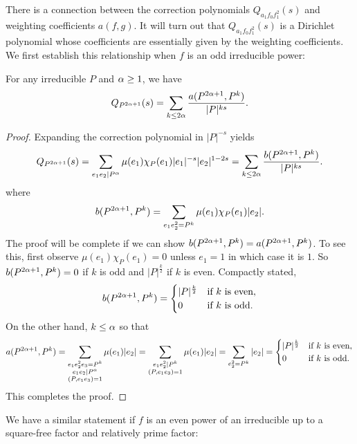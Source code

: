 \documentclass[12pt,reqno,oneside]{amsart}
\begin{document}
    There is a connection between the correction polynomials $Q_{a_{1}f_{0}f_{1}^{2}}(s)$ and weighting coefficients $a(f,g)$. It will turn out that $Q_{a_{1}f_{0}f_{1}^{2}}(s)$ is a Dirichlet polynomial whose coefficients are essentially given by the weighting coefficients. We first establish this relationship when $f$ is an odd irreducible power:

    \begin{lemma}\label{lem:prime_correction_odd}
        For any irreducible $P$ and $\alpha \ge 1$, we have
        \[
            Q_{P^{2\alpha+1}}(s) = \sum_{k \le 2\alpha}\frac{a(P^{2\alpha+1},P^{k})}{|P|^{ks}}.
        \]
    \end{lemma}
    \begin{proof}
        Expanding the correction polynomial in $|P|^{-s}$ yields
        \[
            Q_{P^{2\alpha+1}}(s) = \sum_{e_{1}e_{2} \mid P^{\alpha}}\mu(e_{1})\chi_{P}(e_{1})|e_{1}|^{-s}|e_{2}|^{1-2s} = \sum_{k \le 2\alpha}\frac{b(P^{2\alpha+1},P^{k})}{|P|^{ks}}.
        \]
        where
        \[
            b(P^{2\alpha+1},P^{k}) = \sum_{e_{1}e_{2}^{2} = P^{k}}\mu(e_{1})\chi_{P}(e_{1})|e_{2}|.
        \]
        The proof will be complete if we can show $b(P^{2\alpha+1},P^{k}) = a(P^{2\alpha+1},P^{k})$. To see this, first observe $\mu(e_{1})\chi_{P}(e_{1}) = 0$ unless $e_{1} = 1$ in which case it is $1$. So $b(P^{2\alpha+1},P^{k}) = 0$ if $k$ is odd and $|P|^{\frac{k}{2}}$ if $k$ is even. Compactly stated,
        \[
            b(P^{2\alpha+1},P^{k}) = \begin{cases} |P|^{\frac{k}{2}} & \text{if $k$ is even}, \\ 0 & \text{if $k$ is odd}. \end{cases}
        \]
        On the other hand, $k \le \alpha$ so that
        \[
            a(P^{2\alpha+1},P^{k}) = \sum_{\substack{e_{1}e_{2}^{2}e_{3} = P^{k} \\ e_{1}e_{2} \mid P^{\alpha} \\ (P,e_{1}e_{3}) = 1}}\mu(e_{1})|e_{2}| = \sum_{\substack{e_{1}e_{2}^{2} \mid P^{k} \\ (P,e_{1}e_{3}) = 1}}\mu(e_{1})|e_{2}| = \sum_{e_{2}^{2} = P^{k}}|e_{2}| =  \begin{cases} |P|^{\frac{k}{2}} & \text{if $k$ is even}, \\ 0 & \text{if $k$ is odd}. \end{cases}
        \]
        This completes the proof.
    \end{proof}

    We have a similar statement if $f$ is an even power of an irreducible up to a square-free factor and relatively prime factor:
    
\end{document}
